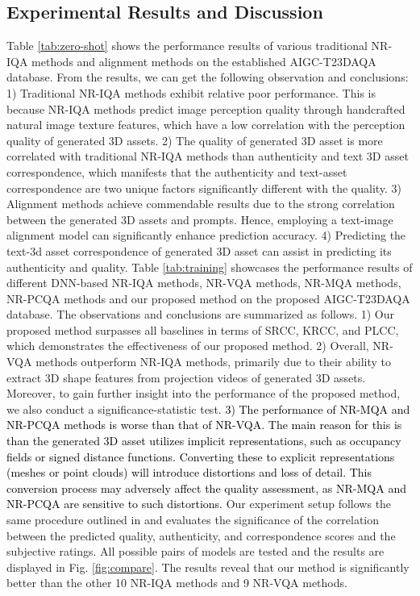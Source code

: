 \subsection{Experimental Results and Discussion}

Table \ref{tab:zero-shot} shows the performance results of various traditional NR-IQA methods and alignment methods on the established AIGC-T23DAQA database. From the results, we can get the following observation and conclusions:  1) Traditional NR-IQA methods exhibit relative poor performance. This is because NR-IQA methods predict image perception quality through handcrafted natural image texture features, which have a low correlation with the perception quality of generated 3D assets. 2) The quality of generated 3D asset is more correlated with traditional NR-IQA methods than authenticity and text 3D asset correspondence, which manifests that the authenticity and text-asset correspondence are two unique factors significantly different with the quality.  3) Alignment methods achieve commendable results due to the strong correlation between the generated 3D assets and prompts. Hence, employing a text-image alignment model can significantly enhance prediction accuracy. 4) Predicting the text-3d asset correspondence of generated 3D asset can assist in predicting its authenticity and quality. Table \ref{tab:training} showcases the performance results of different DNN-based NR-IQA methods, NR-VQA methods, NR-MQA methods, NR-PCQA methods and our proposed method on the proposed AIGC-T23DAQA database. The observations and conclusions are summarized as follows. 1) Our proposed method surpasses all baselines in terms of SRCC, KRCC, and PLCC, which demonstrates the effectiveness of our proposed method. 2) Overall, NR-VQA methods outperform NR-IQA methods, primarily due to their ability to extract 3D shape features from projection videos of generated 3D assets. Moreover, to gain further insight into the performance of the proposed method, we also conduct a significance-statistic test. \textcolor{black}{3) The performance of NR-MQA and NR-PCQA methods is worse than that of NR-VQA. The main reason for this is than the generated 3D asset utilizes implicit representations, such as occupancy fields or signed distance functions. Converting these to explicit representations (meshes or point clouds) will introduce distortions and loss of detail. This conversion process may adversely affect the quality assessment, as NR-MQA and NR-PCQA are sensitive to such distortions.} Our experiment setup follows the same procedure outlined in \cite{sheikh2006statistical} and evaluates the significance of the correlation between the predicted quality, authenticity, and correspondence scores and the subjective ratings. All possible pairs of models are tested and the results are displayed in Fig. \ref{fig:compare}. The results reveal that our method is significantly better than the other 10 NR-IQA methods and 9 NR-VQA methods.

